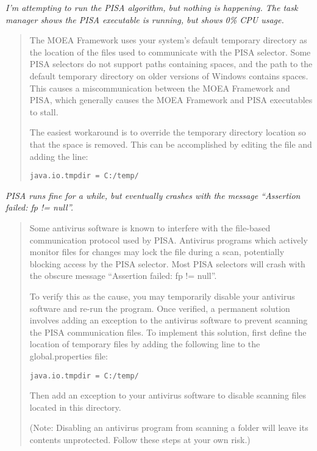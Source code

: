 \noindent
\textit{I'm attempting to run the PISA algorithm, but nothing is happening.  The task manager shows the PISA executable is running, but shows 0\% CPU usage.}

\begin{quote}
The MOEA Framework uses your system's default temporary directory as the location of the files used to communicate with the PISA selector.  Some PISA selectors do not support paths containing spaces, and the path to the default temporary directory on older versions of Windows contains spaces.  This causes a miscommunication between the MOEA Framework and PISA, which generally causes the MOEA Framework and PISA executables to stall.

The easiest workaround is to override the temporary directory location so that the space is removed.  This can be accomplished by editing the  file and adding the line:

\begin{lstlisting}[language=Plaintext]
java.io.tmpdir = C:/temp/
\end{lstlisting}
\end{quote}

\noindent
\textit{PISA runs fine for a while, but eventually crashes with the message ``Assertion failed: fp != null''.}

\begin{quote}
Some antivirus software is known to interfere with the file-based communication protocol used by PISA.  Antivirus programs which actively monitor files for changes may lock the file during a scan, potentially blocking access by the PISA selector.  Most PISA selectors will crash with the obscure message ``Assertion failed: fp != null''.

To verify this as the cause, you may temporarily disable your antivirus software and re-run the program.  Once verified, a permanent solution involves adding an exception to the antivirus software to prevent scanning the PISA communication files.  To implement this solution, first define the location of temporary files by adding the following line to the global.properties file:

\begin{lstlisting}[language=Plaintext]
java.io.tmpdir = C:/temp/
\end{lstlisting}

Then add an exception to your antivirus software to disable scanning files located in this directory.

(Note: Disabling an antivirus program from scanning a folder will leave its contents unprotected.  Follow these steps at your own risk.)
\end{quote}

